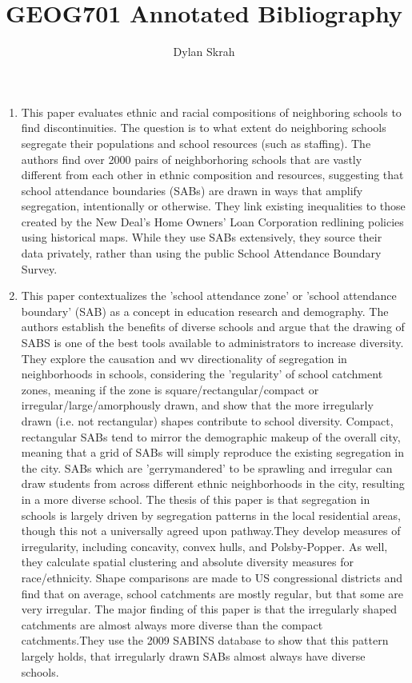 \documentclass{article}
\begin{document}
\title{GEOG701 Annotated Bibliography}
\author{Dylan Skrah}
\maketitle
 
\begin{enumerate}

\item \cite{monarrez2021RaciallyUnequal}
  
This paper evaluates ethnic and racial compositions of neighboring
schools to find discontinuities. The question is to what extent do
neighboring schools segregate their populations and school resources
(such as staffing). The authors find over 2000 pairs of neighborhoring
schools that are vastly different from each other in ethnic
composition and resources, suggesting that school attendance
boundaries (SABs) are drawn in ways that amplify segregation,
intentionally or otherwise. They link existing inequalities to those
created by the New Deal's Home Owners' Loan Corporation redlining
policies using historical maps. While they use SABs extensively, they
source their data privately, rather than using the public School
Attendance Boundary Survey.


\item \cite{saporito2016IrregularlyShaped}

This paper contextualizes the 'school attendance zone' or 'school
attendance boundary' (SAB) as a concept in education research and
demography. The authors establish the benefits of diverse schools and
argue that the drawing of SABS is one of the best tools available to
administrators to increase diversity. They explore the causation and wv
directionality of segregation in neighborhoods in schools, considering
the 'regularity' of school catchment zones, meaning if the zone is
square/rectangular/compact or irregular/large/amorphously drawn, and
show that the more irregularly drawn (i.e. not rectangular) shapes
contribute to school diversity. Compact, rectangular SABs tend to
mirror the demographic makeup of the overall city, meaning that a grid
of SABs will simply reproduce the existing segregation in the
city. SABs which are 'gerrymandered' to be sprawling and irregular can
draw students from across different ethnic neighborhoods in the city,
resulting in a more diverse school. The thesis of this paper is that
segregation in schools is largely driven by segregation patterns in
the local residential areas, though this not a universally agreed upon
pathway.They develop measures of irregularity, including concavity,
convex hulls, and Polsby-Popper. As well, they calculate spatial
clustering and absolute diversity measures for race/ethnicity. Shape
comparisons are made to US congressional districts and find that on
average, school catchments are mostly regular, but that some are very
irregular. The major finding of this paper is that the irregularly
shaped catchments are almost always more diverse than the compact
catchments.They use the 2009 SABINS database to show that this pattern
largely holds, that irregularly drawn SABs almost always have diverse
schools.




\end{enumerate}
\end{document}
